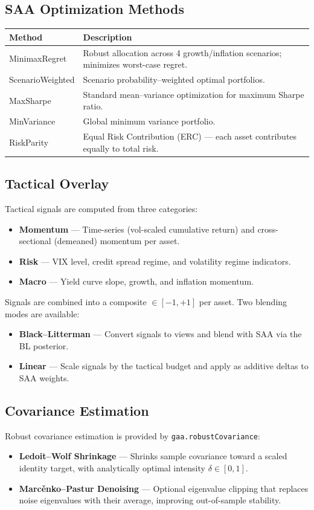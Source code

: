 \documentclass[11pt,a4paper]{article}
\begin{document}
\subsection{SAA Optimization Methods}
\begin{center}
\begin{tabularx}{\textwidth}{l X}
\toprule
\textbf{Method} & \textbf{Description} \\
\midrule
MinimaxRegret & Robust allocation across 4 growth/inflation scenarios; minimizes worst-case regret. \\
ScenarioWeighted & Scenario probability--weighted optimal portfolios. \\
MaxSharpe & Standard mean--variance optimization for maximum Sharpe ratio. \\
MinVariance & Global minimum variance portfolio. \\
RiskParity & Equal Risk Contribution (ERC) --- each asset contributes equally to total risk. \\
\bottomrule
\end{tabularx}
\end{center}

\subsection{Tactical Overlay}
Tactical signals are computed from three categories:
\begin{itemize}[leftmargin=2em]
  \item \textbf{Momentum} --- Time-series (vol-scaled cumulative return) and cross-sectional (demeaned) momentum per asset.
  \item \textbf{Risk} --- VIX level, credit spread regime, and volatility regime indicators.
  \item \textbf{Macro} --- Yield curve slope, growth, and inflation momentum.
\end{itemize}
Signals are combined into a composite $\in [-1,+1]$ per asset. Two blending modes are available:
\begin{itemize}[leftmargin=2em]
  \item \textbf{Black--Litterman} --- Convert signals to views and blend with SAA via the BL posterior.
  \item \textbf{Linear} --- Scale signals by the tactical budget and apply as additive deltas to SAA weights.
\end{itemize}

\subsection{Covariance Estimation}
Robust covariance estimation is provided by \texttt{gaa.robustCovariance}:
\begin{itemize}[leftmargin=2em]
  \item \textbf{Ledoit--Wolf Shrinkage} --- Shrinks sample covariance toward a scaled identity target, with analytically optimal intensity $\delta \in [0,1]$.
  \item \textbf{Marc\v{e}nko--Pastur Denoising} --- Optional eigenvalue clipping that replaces noise eigenvalues with their average, improving out-of-sample stability.
\end{itemize}
\end{document}
